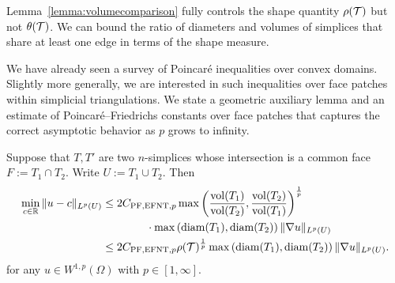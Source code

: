 \documentclass[10pt,letterpaper]{article}
\begin{document}
\begin{remark}
    Lemma~\ref{lemma:volumecomparison} fully controls the shape quantity $\rho({\mathcal T})$ but not $\theta({\mathcal T})$. 
    We can bound the ratio of diameters and volumes of simplices that share at least one edge in terms of the shape measure. 
\end{remark}



We have already seen a survey of Poincar\'e inequalities over convex domains. 
Slightly more generally, we are interested in such inequalities over face patches within simplicial triangulations. 
We state a geometric auxiliary lemma and an estimate of Poincar\'e--Friedrichs constants over face patches 
that captures the correct asymptotic behavior as $p$ grows to infinity.

\begin{lemma}\label{lemma:poincarefriedrichsoverfacepatch}
    Suppose that $T, T'$ are two $n$-simplices whose intersection is a common face $F := T_1 \cap T_2$. 
    Write $U := T_1 \cup T_2$. 
    Then 
    \begin{align*}
        \min\limits_{ c \in {\mathbb R} }
        \| u - c \|_{L^{p}(U)}
        &
        \leq 
        2 C_{{\rm PF},{\rm EFNT},p}
        \max\left( 
            \frac{ \operatorname{vol}(T_1) }{ \operatorname{vol}(T_2) }
            ,
            \frac{ \operatorname{vol}(T_2) }{ \operatorname{vol}(T_1) }
        \right)^{\frac 1 p}
        \\&\qquad\qquad 
        \cdot 
        \max\left( {\operatorname{diam}}(T_1), {\operatorname{diam}}(T_2) \right)
        \| \nabla u \|_{L^{p}(U)}
        \\&
        \leq 
        2 C_{{\rm PF},{\rm EFNT},p}
        \rho({\mathcal T})^{\frac 1 p}
        \max\left( {\operatorname{diam}}(T_1), {\operatorname{diam}}(T_2) \right)
        \| \nabla u \|_{L^{p}(U)}
        .
    \end{align*}
    for any $u \in W^{1,p}(\Omega)$ with $p \in [1,\infty]$.
\end{lemma}
\end{document}
